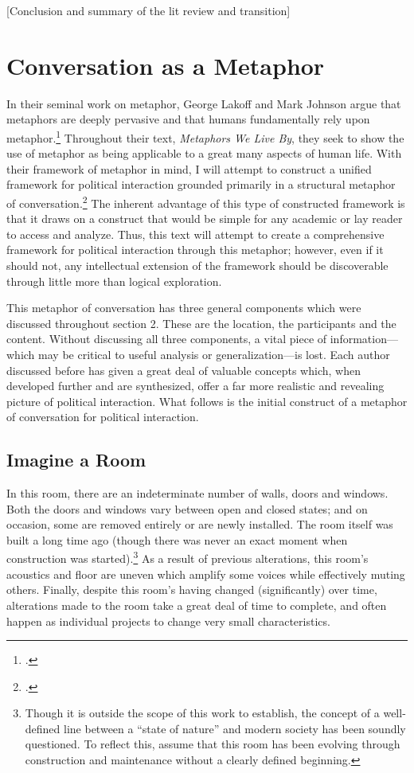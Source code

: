 \documentclass{article}
\begin{document}
[Conclusion and summary of the lit review and transition]

\section{Conversation as a Metaphor}
In their seminal work on metaphor, George Lakoff and Mark Johnson argue that metaphors are deeply pervasive and that humans fundamentally rely upon metaphor.\footcite[3--6]{lakoffjohnson80}
Throughout their text, \emph{Metaphors We Live By}, they seek to show the use of metaphor as being applicable to a great many aspects of human life.
With their framework of metaphor in mind, I will attempt to construct a unified framework for political interaction grounded primarily in a structural metaphor of conversation.\footcite[14]{lakoffjohnson80} 
The inherent advantage of this type of constructed framework is that it draws on a construct that would be simple for any academic or lay reader to access and analyze.
Thus, this text will attempt to create a comprehensive framework for political interaction through this metaphor; however, even if it should not, any intellectual extension of the framework should be discoverable through little more than logical exploration.

This metaphor of conversation has three general components which were discussed throughout section 2.
These are the location, the participants and the content.
Without discussing all three components, a vital piece of information---which may be critical to useful analysis or generalization---is lost.
Each author discussed before has given a great deal of valuable concepts which, when developed further and are synthesized, offer a far more realistic and revealing picture of political interaction.
What follows is the initial construct of a metaphor of conversation for political interaction.

\subsection{Imagine a Room}
In this room, there are an indeterminate number of walls, doors and windows.
Both the doors and windows vary between open and closed states; and on occasion, some are removed entirely or are newly installed.
The room itself was built a long time ago (though there was never an exact moment when construction was started).\footnote{Though it is outside the scope of this work to establish, the concept of a well-defined line between a ``state of nature'' and modern society has been soundly questioned. To reflect this, assume that this room has been evolving through construction and maintenance without a clearly defined beginning.}
As a result of previous alterations, this room's acoustics and floor are uneven which amplify some voices while effectively muting others. 
Finally, despite this room's having changed (significantly) over time, alterations made to the room take a great deal of time to complete, and often happen as individual projects to change very small characteristics.
\end{document}
